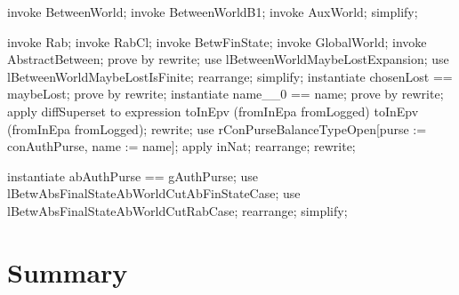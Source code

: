 \begin{LPScript}\begin{zproof}[lBetweenWorldMaybeLostIsFinite]
    invoke BetweenWorld;
    invoke BetweenWorldB1;
    invoke AuxWorld;
    simplify;
\end{zproof}\end{LPScript}


\begin{LPScript}\begin{zproof}[lBetwAbsFinalStateAbWorldCutRabCase]
    invoke Rab;
    invoke RabCl;
    invoke BetwFinState;
    invoke GlobalWorld;
    invoke AbstractBetween;
    prove by rewrite;
    use lBetweenWorldMaybeLostExpansion;
    use lBetweenWorldMaybeLostIsFinite;
    rearrange;
    simplify;
    instantiate chosenLost == maybeLost;
    prove by rewrite;
    instantiate name\_\_0 == name;
    prove by rewrite;
    apply diffSuperset to expression
        toInEpv \cap (fromInEpa \cup fromLogged)
        \setminus toInEpv \cap (fromInEpa \cup fromLogged);
    rewrite;
    use rConPurseBalanceTypeOpen[purse := conAuthPurse, name := name];
    apply inNat;
    rearrange;
    rewrite;
\end{zproof}\end{LPScript}

\begin{LPScript}\begin{zproof}[tBetwAbsFinalState]
    instantiate abAuthPurse == gAuthPurse;
    use lBetwAbsFinalStateAbWorldCutAbFinStateCase;
    use lBetwAbsFinalStateAbWorldCutRabCase;
    rearrange;
    simplify;
\end{zproof}\end{LPScript}

\newpage
\section{Summary}\label{ch12.ps.summary}
\lpscriptsummary
